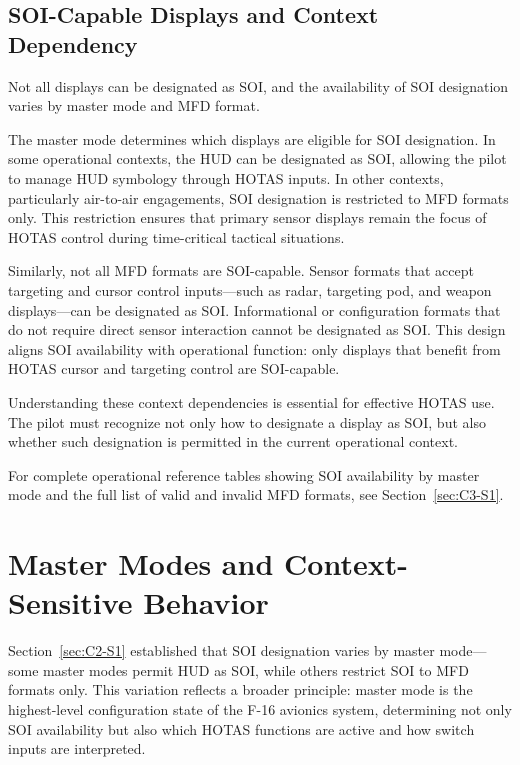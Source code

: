 \documentclass[11pt, a4paper, twoside]{report}
\begin{document}
\subsection{SOI-Capable Displays and Context Dependency}
\label{sec:C2-S1-S3}

Not all displays can be designated as SOI, and the availability of SOI designation varies by master mode and MFD format.

The master mode determines which displays are eligible for SOI designation. In some operational contexts, the HUD can be designated as SOI, allowing the pilot to manage HUD symbology through HOTAS inputs. In other contexts, particularly air-to-air engagements, SOI designation is restricted to MFD formats only. This restriction ensures that primary sensor displays remain the focus of HOTAS control during time-critical tactical situations.

Similarly, not all MFD formats are SOI-capable. Sensor formats that accept targeting and cursor control inputs—such as radar, targeting pod, and weapon displays—can be designated as SOI. Informational or configuration formats that do not require direct sensor interaction cannot be designated as SOI. This design aligns SOI availability with operational function: only displays that benefit from HOTAS cursor and targeting control are SOI-capable.

Understanding these context dependencies is essential for effective HOTAS use. The pilot must recognize not only how to designate a display as SOI, but also whether such designation is permitted in the current operational context.

For complete operational reference tables showing SOI availability by master mode and the full list of valid and invalid MFD formats, see Section~\ref{sec:C3-S1}.


\section{Master Modes and Context-Sensitive Behavior}
\label{sec:C2-S2}

Section~\ref{sec:C2-S1} established that SOI designation varies by master mode—some master modes permit HUD as SOI, while others restrict SOI to MFD formats only. This variation reflects a broader principle: master mode is the highest-level configuration state of the F-16 avionics system, determining not only SOI availability but also which HOTAS functions are active and how switch inputs are interpreted.
\end{document}
